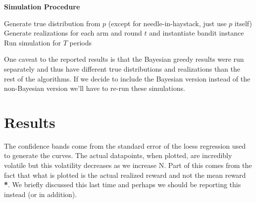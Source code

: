 \documentclass[11pt,letterpaper]{article}
\begin{document}
\pagebreak
\textbf{Simulation Procedure}
\begin{algorithm}
\begin{algorithmic}[1]
		\State Generate true distribution from $p$ (except for needle-in-haystack, just use $p$ itself)
		\State Generate realizations for each arm and round $t$ and instantiate bandit instance
			\State Run simulation for $T$ periods
		\EndFor
	\EndFor
\EndFor
\end{algorithmic}
\end{algorithm}

One caveat to the reported results is that the Bayesian greedy results were run separately and thus have different true distributions and realizations than the rest of the algorithms. If we decide to include the Bayesian version instead of the non-Bayesian version we'll have to re-run these simulations.

\section*{Results}

The confidence bands come from the standard error of the loess regression used to generate the curves. The actual datapoints, when plotted, are incredibly volatile but this volatility decreases as we increase N. Part of this comes from the fact that what is plotted is the actual realized reward and not the mean reward \textbf{*}. We briefly discussed this last time and perhaps we should be reporting this instead (or in addition). \\
\end{document}
